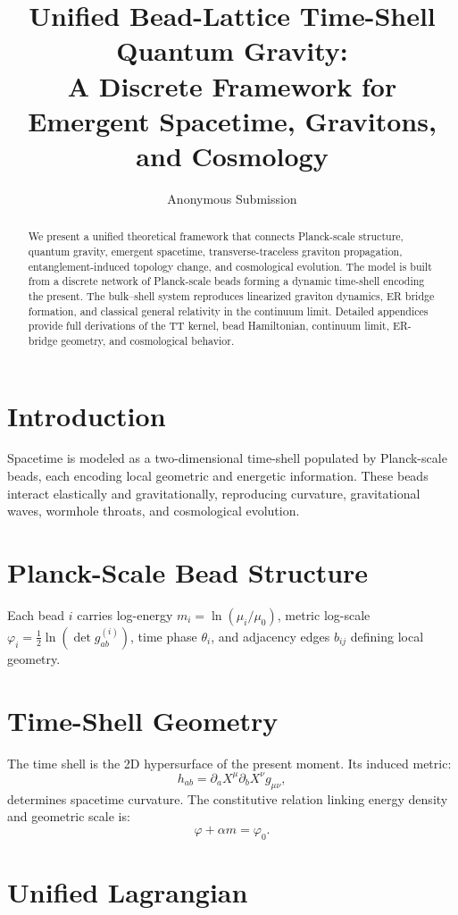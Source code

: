 \documentclass[12pt]{article}
\title{Unified Bead-Lattice Time-Shell Quantum Gravity:\\
A Discrete Framework for Emergent Spacetime, Gravitons, and Cosmology}
\author{Anonymous Submission}
\date{}
\begin{document}
\maketitle

\begin{abstract}
We present a unified theoretical framework that connects Planck-scale structure,
quantum gravity, emergent spacetime, transverse-traceless graviton propagation,
entanglement-induced topology change, and cosmological evolution. The model is 
built from a discrete network of Planck-scale beads forming a dynamic time-shell
encoding the present. The bulk–shell system reproduces linearized graviton 
dynamics, ER bridge formation, and classical general relativity in the continuum 
limit. Detailed appendices provide full derivations of the TT kernel, bead 
Hamiltonian, continuum limit, ER-bridge geometry, and cosmological behavior.
\end{abstract}

\section{Introduction}
Spacetime is modeled as a two-dimensional time-shell populated by Planck-scale 
beads, each encoding local geometric and energetic information. These beads 
interact elastically and gravitationally, reproducing curvature, gravitational 
waves, wormhole throats, and cosmological evolution.

\section{Planck-Scale Bead Structure}
Each bead $i$ carries log-energy $m_i = \ln(\mu_i/\mu_0)$, metric log-scale 
$\varphi_i = \tfrac{1}{2}\ln(\det g^{(i)}_{ab})$, time phase $\theta_i$, and 
adjacency edges $b_{ij}$ defining local geometry.

\section{Time-Shell Geometry}
The time shell is the 2D hypersurface of the present moment. Its induced metric:
\[
h_{ab} = \partial_a X^\mu \partial_b X^\nu g_{\mu\nu},
\]
determines spacetime curvature. The constitutive relation linking energy density 
and geometric scale is:
\[
\varphi + \alpha m = \varphi_0.
\]

\section{Unified Lagrangian}
\end{document}
